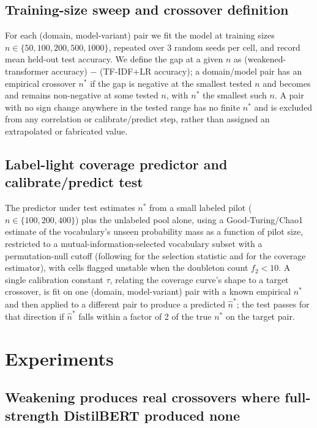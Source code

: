 \documentclass[11pt,letterpaper]{article}
\begin{document}
\subsection{Training-size sweep and crossover definition}

For each (domain, model-variant) pair we fit the model at training sizes $n \in \{50, 100, 200, 500, 1000\}$, repeated over 3 random seeds per cell, and record mean held-out test accuracy. We define the gap at a given $n$ as (weakened-transformer accuracy) $-$ (TF-IDF+LR accuracy); a domain/model pair has an empirical crossover $n^*$ if the gap is negative at the smallest tested $n$ and becomes and remains non-negative at some tested $n$, with $n^*$ the smallest such $n$. A pair with no sign change anywhere in the tested range has no finite $n^*$ and is excluded from any correlation or calibrate/predict step, rather than assigned an extrapolated or fabricated value.

\subsection{Label-light coverage predictor and calibrate/predict test}

The predictor under test estimates $n^*$ from a small labeled pilot ($n\in\{100,200,400\}$) plus the unlabeled pool alone, using a Good-Turing/Chao1 estimate of the vocabulary's unseen probability mass as a function of pilot size, restricted to a mutual-information-selected vocabulary subset with a permutation-null cutoff (following \citealp{YangPedersen1997} for the selection statistic and \citealp{Good1953,GaleSampson1995,Chao1984} for the coverage estimator), with cells flagged unstable when the doubleton count $f_2 < 10$. A single calibration constant $\tau$, relating the coverage curve's shape to a target crossover, is fit on one (domain, model-variant) pair with a known empirical $n^*$ and then applied to a different pair to produce a predicted $\hat n^*$; the test passes for that direction if $\hat n^*$ falls within a factor of 2 of the true $n^*$ on the target pair.

\section{Experiments}

\subsection{Weakening produces real crossovers where full-strength DistilBERT produced none}
\end{document}
